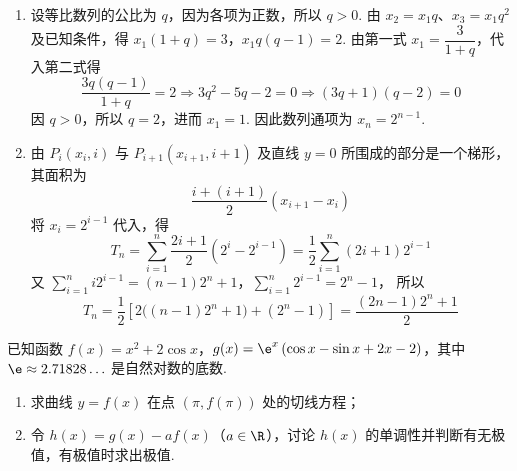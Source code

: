 \begin{solution}
\begin{enumerate}
\item 设等比数列的公比为 \(q\)，因为各项为正数，所以 \(q>0\). 由 \(x_2=x_1q\)、\(x_3=x_1q^2\) 及已知条件，得
\(x_1(1+q)=3\)，\(x_1q(q-1)=2\).
由第一式 \(x_1=\dfrac3{1+q}\)，代入第二式得
\[
\frac{3q(q-1)}{1+q}=2
\Longrightarrow 3q^2-5q-2=0
\Longrightarrow (3q+1)(q-2)=0
\]
因 \(q>0\)，所以 \(q=2\)，进而 \(x_1=1\). 因此数列通项为 \(x_n=2^{n-1}\).
\item 由 \(P_i(x_i,i)\) 与 \(P_{i+1}(x_{i+1},i+1)\) 及直线 \(y=0\) 所围成的部分是一个梯形，其面积为
\[
\frac{i+(i+1)}2(x_{i+1}-x_i)
\]
将 \(x_i=2^{i-1}\) 代入，得
\[
T_n=\sum_{i=1}^n\frac{2i+1}{2}\left(2^i-2^{i-1}\right)=\frac12\sum_{i=1}^n(2i+1)2^{i-1}
\]
又
\(\sum_{i=1}^n i2^{i-1}=(n-1)2^n+1\)，\(\sum_{i=1}^n2^{i-1}=2^n-1\)，
所以
\[
T_n=\frac12\left[2\bigl((n-1)2^n+1\bigr)+(2^n-1)\right]=\frac{(2n-1)2^n+1}{2}
\]
\end{enumerate}
\end{solution}

\begin{problem}
已知函数 \(f(x)=x^2+2\cos x\)，\(g(x)=\e^x\left( \cos x-\sin x+2x-2 \right)\)，其中 \(\e\approx2.71828\ldots\) 是自然对数的底数.

\begin{enumerate}
\item 求曲线 \(y=f(x)\) 在点 \((\pi,f(\pi))\) 处的切线方程；
\item 令 \(h(x)=g(x)-af(x)\)（\(a\in\R\)），讨论 \(h(x)\) 的单调性并判断有无极值，有极值时求出极值.
\end{enumerate}
\end{problem}

